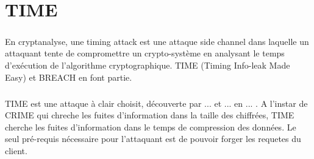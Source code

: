 \chapter{TIME}

\paragraph{}
En cryptanalyse, une timing attack est une attaque side channel dans laquelle un attaquant tente de compromettre un crypto-système en analysant le temps d'exécution de l'algorithme cryptographique. TIME (Timing Info-leak Made Easy) et BREACH en font partie.

\paragraph{}
TIME est une attaque à clair choisit, découverte par ... et ... en ... . A l'instar de CRIME qui chreche les fuites d'information dans la taille des chiffrées, TIME cherche les fuites d'information dans le temps de compression des données. Le seul pré-requis nécessaire pour l'attaquant est de pouvoir forger les requetes du client.
